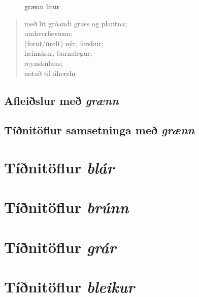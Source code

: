 \documentclass[12pt,b5paper,twosided,openright]{book}
\begin{document}
\begin{figure}[H]
\begin{tcolorbox}
	\centering
\end{tcolorbox}
	\caption{grænn litur}
	\label{mynd:graent}
\end{figure}

\begin{quote}
með lit gróandi grass og plantna; \\
umhverfisvænn; \\
(fornt/úrelt) nýr, ferskur; \\
heimskur, barnalegur; \\
reynskulaus; \\
notað til áherslu
\end{quote}

\section{Afleiðslur með \textit{grænn}}
\label{afl:graenafl}


\section{Tíðnitöflur samsetninga með \textit{grænn}}
\label{tidni:graentid}



\chapter{Tíðnitöflur \textit{blár}}
\label{auki:blarauk}


\chapter{Tíðnitöflur \textit{brúnn}}
\label{auki:brunauk}


\chapter{Tíðnitöflur \textit{grár}}
\label{auki:grarauk}


\chapter{Tíðnitöflur \textit{bleikur}}
\label{auki:bleikauk}


\end{document}
